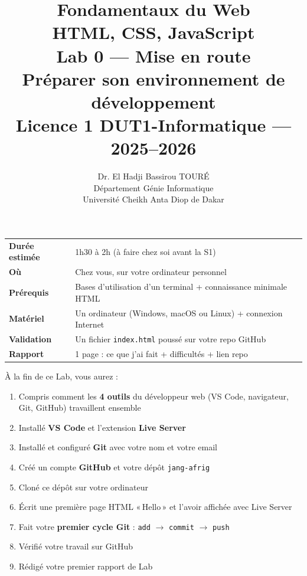 \documentclass[11pt,a4paper]{article}
\title{%
\vspace{-1cm}
\textbf{\LARGE Fondamentaux du Web}\\
\textbf{\LARGE HTML, CSS, JavaScript}\\[0.8cm]
\textbf{\huge Lab 0 --- Mise en route}\\[0.3cm]
\textbf{\Large Préparer son environnement de développement}\\[0.5cm]
\large Licence 1 DUT1-Informatique --- 2025--2026}
\author{Dr. El Hadji Bassirou TOURÉ\\
Département Génie Informatique\\
Université Cheikh Anta Diop de Dakar}
\date{}
\begin{document}
\maketitle
\thispagestyle{empty}

\vspace{0.5cm}

\begin{prereqbox}
\begin{center}
\begin{tabular}{ll}
\toprule
\textbf{Durée estimée} & 1h30 à 2h (à faire chez soi avant la S1) \\
\textbf{Où} & Chez vous, sur votre ordinateur personnel \\
\textbf{Prérequis} & Bases d'utilisation d'un terminal + connaissance minimale HTML \\
\textbf{Matériel} & Un ordinateur (Windows, macOS ou Linux) + connexion Internet \\
\textbf{Validation} & Un fichier \texttt{index.html} poussé sur votre repo GitHub \\
\textbf{Rapport} & 1 page : ce que j'ai fait + difficultés + lien repo \\
\bottomrule
\end{tabular}
\end{center}
\end{prereqbox}

\begin{objectifbox}
À la fin de ce Lab, vous aurez :
\begin{enumerate}[nosep]
    \item Compris comment les \textbf{4 outils} du développeur web (VS Code, navigateur, Git, GitHub) travaillent ensemble
    \item Installé \textbf{VS Code} et l'extension \textbf{Live Server}
    \item Installé et configuré \textbf{Git} avec votre nom et votre email
    \item Créé un compte \textbf{GitHub} et votre dépôt \texttt{jang-afrig}
    \item Cloné ce dépôt sur votre ordinateur
    \item Écrit une première page HTML «\,Hello\,» et l'avoir affichée avec Live Server
    \item Fait votre \textbf{premier cycle Git} : \texttt{add} $\to$ \texttt{commit} $\to$ \texttt{push}
    \item Vérifié votre travail sur GitHub
    \item Rédigé votre premier rapport de Lab
\end{enumerate}
\end{objectifbox}
\end{document}
